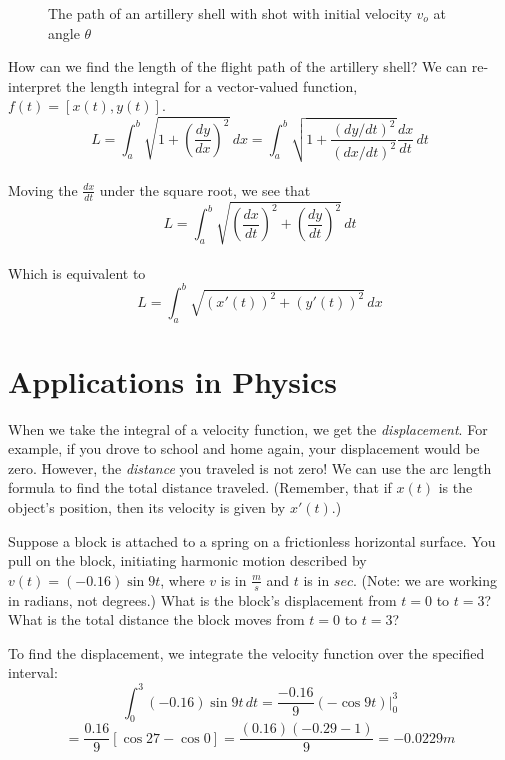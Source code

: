 \begin{figure}[htbp]
\centering
    \caption{The path of an artillery shell with shot with initial 
    velocity $v_o$ at angle $\theta$}
    \label{fig:shell}
\end{figure}  

How can we find the length of the flight path of the artillery shell? 
We can re-interpret the length integral for a vector-valued function, 
$f(t) = [x(t), y(t)]$.  
$$L = \int_a^b \sqrt{1+(\frac{dy}{dx})^2}\,dx = 
\int_a^b \sqrt{1 + \frac{(dy/dt)^2}{(dx/dt)^2}}\frac{dx}{dt}\,dt$$\\
Moving the $\frac{dx}{dt}$ under the square root, we see that
$$L = \int_a^b \sqrt{(\frac{dx}{dt})^2 + (\frac{dy}{dt})^2}\,dt$$\\
Which is equivalent to 
$$L = \int_a^b \sqrt{(x'(t))^2 + (y'(t))^2}\,dx$$

\section{Applications in Physics}
When we take the integral of a velocity function, we get the 
\textit{displacement}. For example, if you drove to school and home 
again, your displacement would be zero. However, the \textit{distance} 
you traveled is not zero! We can use the arc length formula to find 
the total distance traveled. (Remember, that if $x(t)$ is the object's 
position, then its velocity is given by $x'(t)$.)

Suppose a block is attached to a spring on a frictionless horizontal 
surface. You pull on the block, initiating harmonic motion described 
by $v(t) = (-0.16)\sin{9t}$, where $v$ is in $\frac{m}{s}$ and $t$ is 
in $sec$. (Note: we are working in radians, not degrees.) What is the 
block's displacement from $t = 0$ to $t = 3$? What is the total 
distance the block moves from $t = 0$ to $t = 3$? 

To find the displacement, we integrate the velocity function over the 
specified interval:
$$\int_0^3 (-0.16)\sin{9t}\,dt = \frac{-0.16}{9}(-\cos{9t})|_0^3$$
$$=\frac{0.16}{9}[\cos{27} - \cos{0}] = \frac{(0.16)(-0.29 - 1)}{9} 
= -0.0229 m$$

